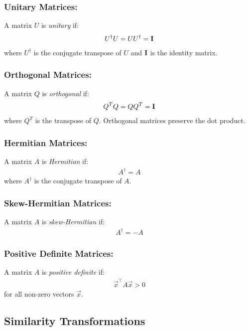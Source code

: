 \documentclass[12pt]{article}
\numberwithin{equation}{subsubsection}
\begin{document}
\subsubsection{Unitary Matrices:}

A matrix $ U $ is \textit{unitary} if:
\begin{align}
U^\dagger U = U U^\dagger = \mathbf{I}
\end{align}
where $ U^\dagger $ is the conjugate transpose of $ U $ and $ \mathbf{I} $ is the identity matrix.

\subsubsection{Orthogonal Matrices:}

A matrix $ Q $ is \textit{orthogonal} if:
\begin{align}
Q^T Q = Q Q^T = \mathbf{I}
\end{align}
where $ Q^T $ is the transpose of $ Q $. Orthogonal matrices preserve the dot product.

\subsubsection{Hermitian Matrices:}

A matrix $ A $ is \textit{Hermitian} if:
\begin{align}
A^\dagger = A
\end{align}
where $ A^\dagger $ is the conjugate transpose of $ A $.

\subsubsection{Skew-Hermitian Matrices:}

A matrix $ A $ is \textit{skew-Hermitian} if:
\begin{align}
A^\dagger = -A
\end{align}

\subsubsection{Positive Definite Matrices:}

A matrix $ A $ is \textit{positive definite} if:
\begin{align}
\vec{x}^\top A\vec{x} > 0
\end{align}
for all non-zero vectors $\vec{x}$.

\subsection{Similarity Transformations}
\end{document}
